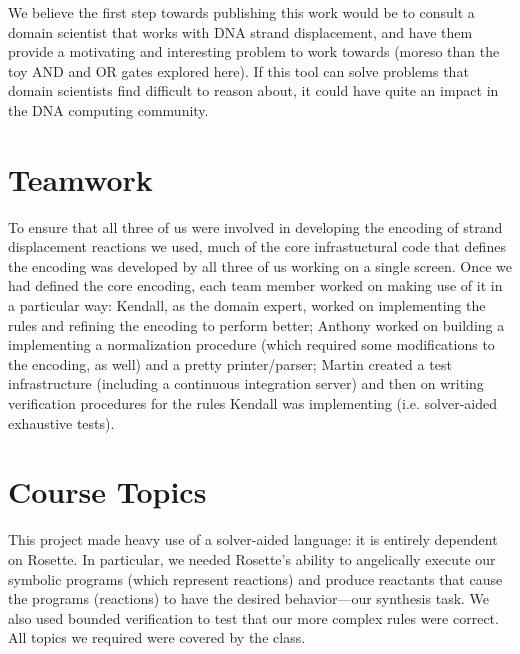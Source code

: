 \documentclass{article}[10pt]
\begin{document}
We believe the first step towards publishing this work would be to
consult a domain scientist that works with DNA strand displacement,
and have them provide a motivating and interesting problem to work
towards (moreso than the toy AND and OR gates explored here). 
If this tool can solve problems that domain scientists find difficult
to reason about, it could have quite an impact in the DNA computing
community.

\section{Teamwork}

To ensure that all three of us were involved in developing the encoding of
strand displacement reactions we used, much of the core infrastuctural code
that defines the encoding was developed by all three of us working on a single
screen. Once we had defined the core encoding, each team member worked on
making use of it in a particular way: Kendall, as the domain expert, worked
on implementing the rules and refining the encoding to perform better; Anthony
worked on building a implementing a normalization procedure (which required
some modifications to the encoding, as well) and a pretty printer/parser;
Martin created a test infrastructure (including a continuous integration server)
and then on writing verification procedures for the rules Kendall was
implementing (i.e. solver-aided exhaustive tests).

\section{Course Topics}

This project made heavy use of a solver-aided language: it is entirely dependent
on Rosette. In particular, we needed Rosette's ability to angelically execute
our symbolic programs (which represent reactions) and produce reactants that
cause the programs (reactions) to have the desired behavior---our synthesis
task. We also used bounded verification to test that our more complex
rules were correct. All topics we required were covered by the class.
\end{document}
